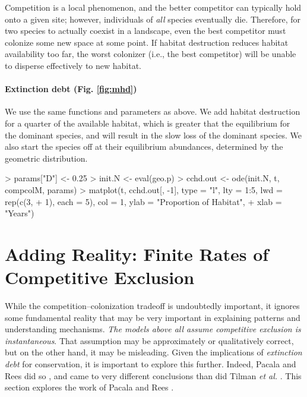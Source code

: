 Competition is a local phenomenon, and the better competitor can typically hold onto a given site; however, individuals of \emph{all} species eventually die. Therefore, for two species to actually coexist in a landscape, even the best competitor must colonize some new space at some point. If habitat destruction reduces habitat availability too far, the worst colonizer (i.e., the best competitor) will be unable to disperse effectively to new habitat.


\medskip \noindent
\begin{boxedminipage}{\linewidth}
  {\footnotesize
\paragraph{Extinction debt (Fig. \ref{fig:mhd})} 
We use the same functions and parameters as above. We add habitat destruction for a quarter of the available habitat, which is greater that the equilibrium for the dominant species, and will result in  the slow loss of the dominant species. We also start the species off at their equilibrium abundances, determined by the geometric distribution.
\begin{Schunk}
\begin{Sinput}
> params["D"] <- 0.25
> init.N <- eval(geo.p)
> cchd.out <- ode(init.N, t, compcolM, params)
> matplot(t, cchd.out[, -1], type = "l", lty = 1:5, lwd = rep(c(3, 
+     1), each = 5), col = 1, ylab = "Proportion of Habitat", 
+     xlab = "Years")
\end{Sinput}
\end{Schunk}
}
\end{boxedminipage} \medskip


\section{Adding Reality: Finite Rates of Competitive Exclusion}
While the competition--colonization tradeoff is undoubtedly important, it ignores some fundamental reality that may be very important in explaining patterns and understanding mechanisms. \emph{The models above all assume competitive exclusion is instantaneous}. That assumption may be approximately or qualitatively correct, but on the other hand, it may be misleading. Given the implications of \emph{extinction debt} for conservation, it is important to explore this further. Indeed, Pacala and Rees did so \cite{Pacala1998}, and came to very different conclusions than did Tilman \emph{et al.} \cite{Tilman1994}. This section explores the work of Pacala and Rees \cite{Pacala1998}.

